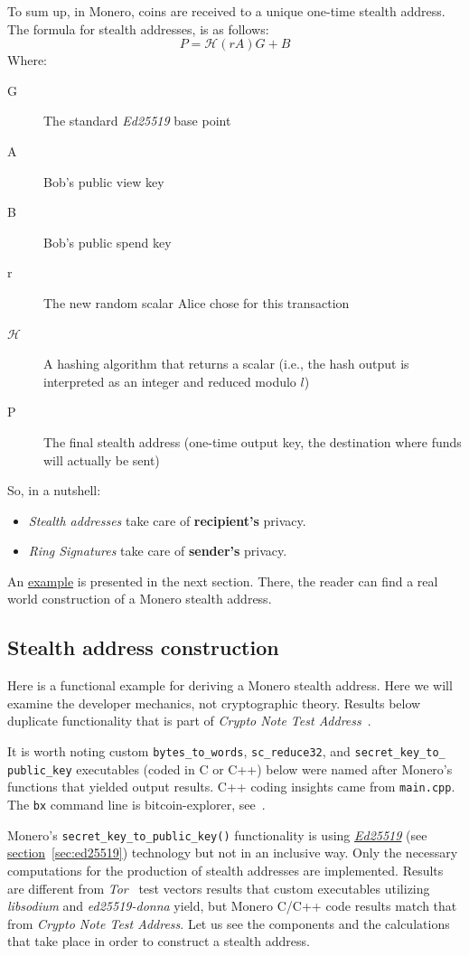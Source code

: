 To sum up, in Monero, coins are received to a unique one-time stealth address. The formula for stealth addresses, is as follows:
\begin{equation}
  P = \mathcal{H}(rA)G + B
\end{equation}
%
Where:
\begin{description}
  \item [G] The standard \emph{Ed25519} base point
  \item [A] Bob's public view key
  \item [B] Bob's public spend key
  \item [r] The new random scalar Alice chose for this transaction
  \item [$\mathcal{H}$] A hashing algorithm that returns a scalar (i.e., the hash output is interpreted as an integer and reduced modulo $l$)
  \item [P] The final stealth address (one-time output key, the destination where funds will actually be sent)
\end{description}
So, in a nutshell:
\begin{itemize}
  \item \emph{Stealth addresses} take care of \textbf{recipient's} privacy.
  \item \emph{Ring Signatures} take care of \textbf{sender's} privacy.
\end{itemize}

An \hyperref[sec:construction]{example} is presented in the next section. There, the reader can find a real world construction of a Monero stealth address.
\clearpage
\pagebreak

\subsection{Stealth address construction} \label{sec:construction}
Here is a functional example for deriving a Monero stealth address. Here we will examine the developer mechanics, not cryptographic theory. Results below duplicate functionality that is part of \emph{Crypto Note Test Address}~\cite{teststealth}.

It is worth noting custom \verb|bytes_to_words|, \verb|sc_reduce32|, and \verb|secret_key_to_| \verb|public_key| executables (coded in C or C++) below were named after Monero's functions that yielded output results. C++ coding insights came from \verb|main.cpp|. The \verb|bx| command line is bitcoin-explorer, see~\cite{bx}.

Monero's \verb|secret_key_to_public_key()| functionality is using \hyperref[sec:ed25519]{\emph{Ed25519}} (see \hyperref[sec:ed25519]{section}~\ref{sec:ed25519}) technology but not in an inclusive way. Only the necessary computations for the production of stealth addresses are implemented. Results are different from \emph{Tor}~\cite{tor} test vectors results that custom executables utilizing \emph{libsodium} and \emph{ed25519-donna} yield, but Monero C/C++ code results match that from \emph{Crypto Note Test Address}. Let us see the components and the calculations that take place in order to construct a stealth address.

